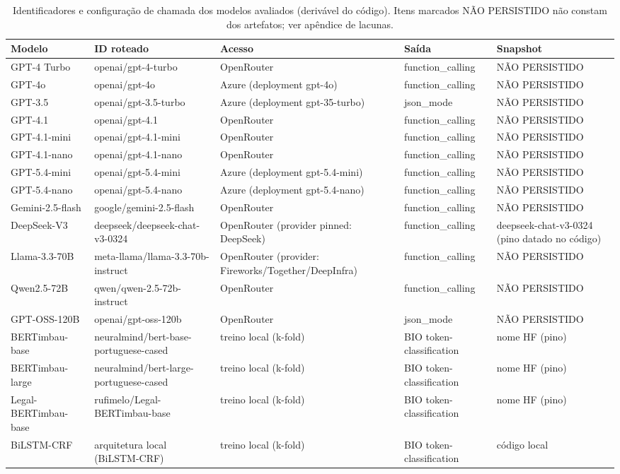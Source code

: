 \begin{table}[ht]
    \centering
    \caption{Identificadores e configuração de chamada dos modelos avaliados (derivável do código). Itens marcados NÃO PERSISTIDO não constam dos artefatos; ver apêndice de lacunas.}
    \label{tab:reprodutibilidade_modelos}
    \scriptsize
    \begin{tabular}{lllll}
        \hline
        \textbf{Modelo} & \textbf{ID roteado} & \textbf{Acesso} & \textbf{Saída} & \textbf{Snapshot} \\
        \hline
        GPT-4 Turbo & openai/gpt-4-turbo & OpenRouter & function\_calling & NÃO PERSISTIDO \\
        GPT-4o & openai/gpt-4o & Azure (deployment gpt-4o) & function\_calling & NÃO PERSISTIDO \\
        GPT-3.5 & openai/gpt-3.5-turbo & Azure (deployment gpt-35-turbo) & json\_mode & NÃO PERSISTIDO \\
        GPT-4.1 & openai/gpt-4.1 & OpenRouter & function\_calling & NÃO PERSISTIDO \\
        GPT-4.1-mini & openai/gpt-4.1-mini & OpenRouter & function\_calling & NÃO PERSISTIDO \\
        GPT-4.1-nano & openai/gpt-4.1-nano & OpenRouter & function\_calling & NÃO PERSISTIDO \\
        GPT-5.4-mini & openai/gpt-5.4-mini & Azure (deployment gpt-5.4-mini) & function\_calling & NÃO PERSISTIDO \\
        GPT-5.4-nano & openai/gpt-5.4-nano & Azure (deployment gpt-5.4-nano) & function\_calling & NÃO PERSISTIDO \\
        Gemini-2.5-flash & google/gemini-2.5-flash & OpenRouter & function\_calling & NÃO PERSISTIDO \\
        DeepSeek-V3 & deepseek/deepseek-chat-v3-0324 & OpenRouter (provider pinned: DeepSeek) & function\_calling & deepseek-chat-v3-0324 (pino datado no código) \\
        Llama-3.3-70B & meta-llama/llama-3.3-70b-instruct & OpenRouter (provider: Fireworks/Together/DeepInfra) & function\_calling & NÃO PERSISTIDO \\
        Qwen2.5-72B & qwen/qwen-2.5-72b-instruct & OpenRouter & function\_calling & NÃO PERSISTIDO \\
        GPT-OSS-120B & openai/gpt-oss-120b & OpenRouter & json\_mode & NÃO PERSISTIDO \\
        BERTimbau-base & neuralmind/bert-base-portuguese-cased & treino local (k-fold) & BIO token-classification & nome HF (pino) \\
        BERTimbau-large & neuralmind/bert-large-portuguese-cased & treino local (k-fold) & BIO token-classification & nome HF (pino) \\
        Legal-BERTimbau-base & rufimelo/Legal-BERTimbau-base & treino local (k-fold) & BIO token-classification & nome HF (pino) \\
        BiLSTM-CRF & arquitetura local (BiLSTM-CRF) & treino local (k-fold) & BIO token-classification & código local \\
        \hline
    \end{tabular}
\end{table}
